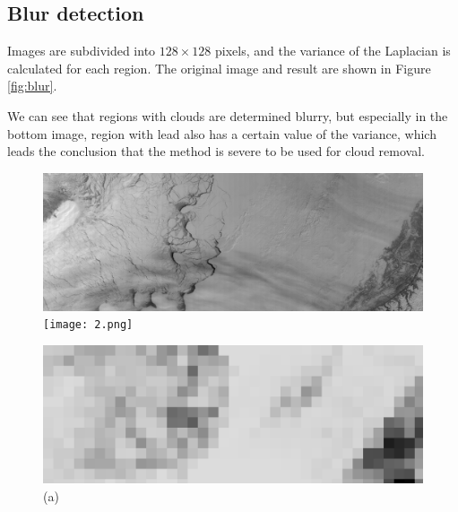 \documentclass{article}
\begin{document}
    \subsection{Blur detection}
        Images are subdivided into $128 \times 128$ pixels,
        and the variance of the Laplacian is calculated for each region.
        The original image and result are shown in Figure \ref{fig:blur}.

        We can see that regions with clouds are determined blurry,
        but especially in the bottom image,
        region with lead also has a certain value of the variance,
        which leads the conclusion that the method is severe to be used for cloud removal.

        \begin{figure}[ht]
            \centering
            \begin{minipage}{0.49\hsize}
                \centering
                \includegraphics[width = 1\hsize]{1.png}
                \texttt{[image: 2.png]}
                \caption*{(a)}
            \end{minipage}
            \begin{minipage}{0.49\hsize}
                \centering
                \includegraphics[width = 1\hsize]{1_blur.png}

\end{minipage}
\end{figure}
\end{document}
